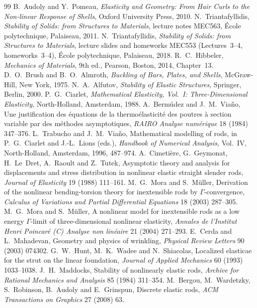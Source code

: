 \begin{chapterbib}{99}
 B.~Audoly and Y.~Pomeau, \emph{Elasticity and Geometry: From Hair Curls to the Non-linear Response of Shells}, Oxford University Press, 2010.
 N.~Triantafyllidis, \emph{Stability of Solids: from Structures to Materials}, lecture notes MEC563, \'Ecole polytechnique, Palaiseau, 2011.
 N.~Triantafyllidis, \emph{Stability of Solids: from Structures to Materials}, lecture slides and homeworks MEC553 (Lectures~3--4, homeworks~3--4), \'Ecole polytechnique, Palaiseau, 2018.
 R.~C.~Hibbeler, \emph{Mechanics of Materials}, 9th ed., Pearson, Boston, 2014, Chapter~13.
 D.~O.~Brush and B.~O.~Almroth, \emph{Buckling of Bars, Plates, and Shells}, McGraw-Hill, New York, 1975.
 N.~A.~Alfutov, \emph{Stability of Elastic Structures}, Springer, Berlin, 2000.
 P.~G.~Ciarlet, \emph{Mathematical Elasticity, Vol.~I: Three-Dimensional Elasticity}, North-Holland, Amsterdam, 1988.
 A.~Berm\'udez and J.~M.~Via\~no, Une justification des \'equations de la thermo\'elasticit\'e des poutres \`a section variable par des m\'ethodes asymptotiques, \emph{RAIRO Analyse num\'erique} 18 (1984) 347--376.
 L.~Trabucho and J.~M.~Via\~no, Mathematical modelling of rods, in P.~G.~Ciarlet and J.-L.~Lions (eds.), \emph{Handbook of Numerical Analysis}, Vol.~IV, North-Holland, Amsterdam, 1996, 487--974.
 A.~Cimeti\`ere, G.~Geymonat, H.~Le~Dret, A.~Raoult and Z.~Tutek, Asymptotic theory and analysis for displacements and stress distribution in nonlinear elastic straight slender rods, \emph{Journal of Elasticity} 19 (1988) 111--161.
 M.~G.~Mora and S.~M\"uller, Derivation of the nonlinear bending-torsion theory for inextensible rods by $\Gamma$-convergence, \emph{Calculus of Variations and Partial Differential Equations} 18 (2003) 287--305.
 M.~G.~Mora and S.~M\"uller, A nonlinear model for inextensible rods as a low energy $\Gamma$-limit of three-dimensional nonlinear elasticity, \emph{Annales de l'Institut Henri Poincar\'e (C) Analyse non lin\'eaire} 21 (2004) 271--293.
 E.~Cerda and L.~Mahadevan, Geometry and physics of wrinkling, \emph{Physical Review Letters} 90 (2003) 074302.
 G.~W.~Hunt, M.~K.~Wadee and N.~Shiacolas, Localized elasticae for the strut on the linear foundation, \emph{Journal of Applied Mechanics} 60 (1993) 1033--1038.
 J.~H.~Maddocks, Stability of nonlinearly elastic rods, \emph{Archive for Rational Mechanics and Analysis} 85 (1984) 311--354.
 M.~Bergou, M.~Wardetzky, S.~Robinson, B.~Audoly and E.~Grinspun, Discrete elastic rods, \emph{ACM Transactions on Graphics} 27 (2008) 63.
\end{chapterbib}
